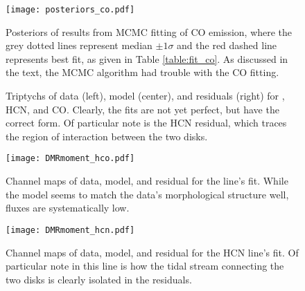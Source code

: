 \begin{figure}%
  \hspace*{\fill}%
  \texttt{[image: posteriors\_co.pdf]}\hfill%
  \hspace*{\fill}%
  \caption{Posteriors of results from MCMC fitting of CO emission, where the grey dotted lines represent median $\pm 1\sigma$ and the red dashed line represents best fit, as given in Table \ref{table:fit_co}. As discussed in the text, the MCMC algorithm had trouble with the CO fitting.}
  \label{fig:co_posteriors}
\end{figure}





\begin{figure}%
  \centering
    \hspace*{\fill}%
    \vfill%
    \vfill%
    \hspace*{\fill}%
    \caption{Triptychs of data (left), model (center), and residuals (right) for \hco, HCN, and CO. Clearly, the fits are not yet perfect, but have the correct form. Of particular note is the HCN residual, which traces the region of interaction between the two disks.}
    \label{fig:dmr_moment_maps}
\end{figure}









\begin{figure}%
  \hspace*{\fill}%
  \texttt{[image: DMRmoment\_hco.pdf]}\hfill%
  \hspace*{\fill}%
  \caption{Channel maps of data, model, and residual for the \hco{} line's fit. While the model seems to match the data's morphological structure well, fluxes are systematically low.}
  \label{fig:hco_chanmaps}
\end{figure}



\begin{figure}%
  \hspace*{\fill}%
  \texttt{[image: DMRmoment\_hcn.pdf]}\hfill%
  \hspace*{\fill}%
  \caption{Channel maps of data, model, and residual for the HCN line's fit. Of particular note in this line is how the tidal stream connecting the two disks is clearly isolated in the residuals.}
  \label{fig:hcn_chanmaps}
\end{figure}




